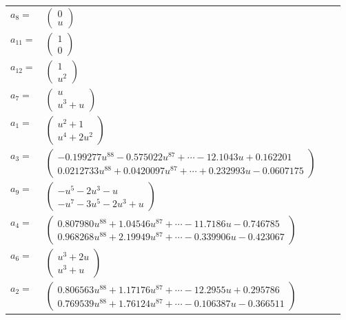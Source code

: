 \documentclass[1p]{elsarticle_modified}
\theoremstyle{definition}
\begin{document}
\begin{tabular}{m{7pt} m{180pt} m{7pt} m{180pt} }
\flushright $a_{8}=$&$\begin{pmatrix}0\\u\end{pmatrix}$ \\
\flushright $a_{11}=$&$\begin{pmatrix}1\\0\end{pmatrix}$ \\
\flushright $a_{12}=$&$\begin{pmatrix}1\\u^2\end{pmatrix}$ \\
\flushright $a_{7}=$&$\begin{pmatrix}u\\u^3+u\end{pmatrix}$ \\
\flushright $a_{1}=$&$\begin{pmatrix}u^2+1\\u^4+2 u^2\end{pmatrix}$ \\
\flushright $a_{3}=$&$\begin{pmatrix}-0.199277 u^{88}-0.575022 u^{87}+\cdots-12.1043 u+0.162201\\0.0212733 u^{88}+0.0420097 u^{87}+\cdots+0.232993 u-0.0607175\end{pmatrix}$ \\
\flushright $a_{9}=$&$\begin{pmatrix}- u^5-2 u^3- u\\- u^7-3 u^5-2 u^3+u\end{pmatrix}$ \\
\flushright $a_{4}=$&$\begin{pmatrix}0.807980 u^{88}+1.04546 u^{87}+\cdots-11.7186 u-0.746785\\0.968268 u^{88}+2.19949 u^{87}+\cdots-0.339906 u-0.423067\end{pmatrix}$ \\
\flushright $a_{6}=$&$\begin{pmatrix}u^3+2 u\\u^3+u\end{pmatrix}$ \\
\flushright $a_{2}=$&$\begin{pmatrix}0.806563 u^{88}+1.17176 u^{87}+\cdots-12.2955 u+0.295786\\0.769539 u^{88}+1.76124 u^{87}+\cdots-0.106387 u-0.366511\end{pmatrix}$ \\

\end{tabular}
\end{document}
